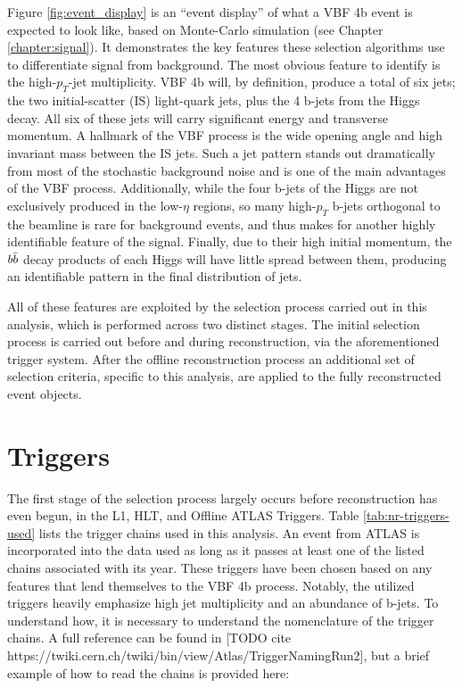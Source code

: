     Figure \ref{fig:event_display} is an ``event display'' of what a VBF \to 4b event is expected to look like,
        based on Monte-Carlo simulation (see Chapter \ref{chapter:signal}).
    It demonstrates the key features these selection algorithms use to differentiate signal from background.
    The most obvious feature to identify is the high-$p_T$-jet multiplicity.
    VBF \to 4b will, by definition, produce a total of six jets;
        the two initial-scatter (IS) light-quark jets, plus the 4 b-jets from the Higgs decay.
    All six of these jets will carry significant energy and transverse momentum.
    A hallmark of the VBF process is the wide opening angle and high invariant mass between the IS jets.
    Such a jet pattern stands out dramatically from most of the stochastic background noise
        and is one of the main advantages of the VBF process.
    Additionally, while the four b-jets of the Higgs are not exclusively produced in the low-$\eta$ regions,
        so many high-$p_T$ b-jets orthogonal to the beamline is rare for background events,
        and thus makes for another highly identifiable feature of the signal.
    Finally, due to their high initial momentum,
        the $b \bar{b}$ decay products of each Higgs will have little spread between them,
        producing an identifiable pattern in the final distribution of jets.

    All of these features are exploited by the selection process carried out in this analysis,
        which is performed across two distinct stages.
    The initial selection process is carried out before and during reconstruction, via the aforementioned trigger system.
    After the offline reconstruction process an additional set of selection criteria,
        specific to this analysis, are applied to the fully reconstructed event objects.
    
    \FloatBarrier
    \section{Triggers}
        
        The first stage of the selection process largely occurs before reconstruction has even begun,
            in the L1, HLT, and Offline ATLAS Triggers.
        Table \ref{tab:nr-triggers-used} lists the trigger chains used in this analysis.
        An event from ATLAS is incorporated into the data used as long as it passes at least one 
            of the listed chains associated with its year.
        These triggers have been chosen based on any features that lend themselves to the VBF \to 4b process.
        Notably, the utilized triggers heavily emphasize high jet multiplicity and an abundance of b-jets.
        To understand how, it is necessary to understand the nomenclature of the trigger chains.
        A full reference can be found in [TODO cite https://twiki.cern.ch/twiki/bin/view/Atlas/TriggerNamingRun2],
            but a brief example of how to read the chains is provided here:

